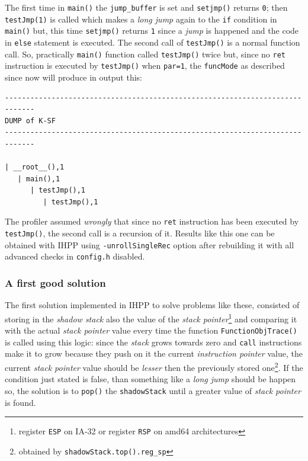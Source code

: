\documentclass[a4paper,10pt]{report}
\begin{document}
\noindent
The first time in \verb|main()| the \verb|jump_buffer| is set and \verb|setjmp()| 
returns \verb|0|; then \verb|testJmp(1)| is called which makes a \emph{long jump} 
again to the \verb|if| condition in \verb|main()| but, this time \verb|setjmp()| returns
\verb|1| since a \emph{jump} is happened and the code in \verb|else| statement 
is executed. The second call of \verb|testJmp()| is a normal function call.
So, practically \verb|main()| function called \verb|testJmp()| twice but, since
no \verb|ret| instruction is executed by \verb|testJmp()| when \verb|par=1|, 
the \verb|funcMode| as described since now will produce in output this:

\begin{lstlisting}[label=longjmp_ex_1, caption={an example of the \emph{longjmp} problem}]
-----------------------------------------------------------------------------
DUMP of K-SF
-----------------------------------------------------------------------------

| __root__(),1
   | main(),1
      | testJmp(),1
         | testJmp(),1
\end{lstlisting}

\noindent
The profiler assumed \emph{wrongly} that since no \verb|ret| instruction 
has been executed by \verb|testJmp()|, the second call is a recursion of it.
Results like this one can be obtained with IHPP using \verb|-unrollSingleRec| option 
after rebuilding it with all advanced checks in \verb|config.h| disabled.

\subsubsection{A first good solution}
The first solution implemented in IHPP to solve problems like these, 
consisted of storing in the \emph{shadow stack} also 
the value of the \emph{stack pointer}\footnote{register \texttt{ESP} on IA-32 or register \texttt{RSP} on amd64 architectures} and comparing it with the actual \emph{stack pointer}
value every time the function \verb|FunctionObjTrace()| is called using this logic:
since the \emph{stack} grows towards zero and \verb|call| instructions make 
it to grow because they push on it the current \emph{instruction pointer} value, 
the current \emph{stack pointer} value should be \emph{lesser} then the previously 
stored one\footnote{obtained by \texttt{shadowStack.top().reg\_sp}}. 
If the condition just stated is false, than something like a \emph{long jump} should be
happen so, the solution is to \verb|pop()| the \verb|shadowStack| until a greater
value of \emph{stack pointer} is found. 
\end{document}
